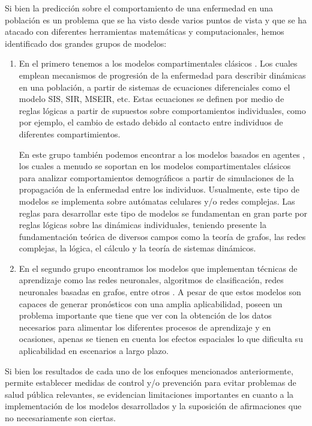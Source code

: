 Si bien la predicción sobre el comportamiento de una enfermedad en una población es un problema que se ha visto desde varios puntos de vista y que se ha atacado con diferentes herramientas matemáticas y computacionales, hemos identificado dos grandes grupos de modelos: 
\begin{enumerate}
    \item En el primero tenemos a los modelos compartimentales clásicos \cite{kermack, miller, hertbert, mateModelsInPopulationAndEpidemiology, diego2010}. Los cuales emplean mecanismos de progresión de la enfermedad para describir dinámicas en una población, a partir de sistemas de ecuaciones diferenciales como el modelo SIS, SIR, MSEIR, etc. Estas ecuaciones se definen por medio de reglas lógicas a partir de supuestos sobre comportamientos individuales, como por ejemplo, el cambio de estado debido al contacto entre individuos de diferentes compartimientos.
    
    En este grupo también podemos encontrar a los modelos basados en agentes \cite{spatialDependences,populationDensity,modelingEpidemicsUsingCA, globalStochastic}, los cuales a menudo se soportan en los modelos compartimentales clásicos para analizar comportamientos demográficos a partir de simulaciones de la propagación de la enfermedad entre los individuos. Usualmente, este tipo de modelos se implementa sobre autómatas celulares y/o redes complejas. Las reglas para desarrollar este tipo de modelos se fundamentan en gran parte por reglas lógicas sobre las dinámicas individuales, teniendo presente la fundamentación teórica de diversos campos como la teoría de grafos, las redes complejas, la lógica, el cálculo y la teoría de sistemas dinámicos.
    \item En el segundo grupo encontramos los modelos que implementan técnicas de aprendizaje como las redes neuronales, algoritmos de clasificación, redes neuronales basadas en grafos, entre otros \cite{stayHome, epidemiologicalNeuralNetwork, colaGNN, combiningGraph, forecasting, fromNeuronsToEpidemics, networksAndepidemics, transfer2021}. A pesar de que estos modelos son capaces de generar pronósticos con una amplia aplicabilidad, poseen un problema importante que tiene que ver con la obtención de los datos necesarios para alimentar los diferentes procesos de aprendizaje y en ocasiones, apenas se tienen en cuenta los efectos espaciales lo que dificulta su aplicabilidad en escenarios a largo plazo.
\end{enumerate}

Si bien los resultados de cada uno de los enfoques mencionados anteriormente, permite establecer medidas de control y/o prevención para evitar problemas de salud pública relevantes, se evidencian limitaciones importantes en cuanto a la implementación de los modelos desarrollados y la suposición de afirmaciones que no necesariamente son ciertas.

